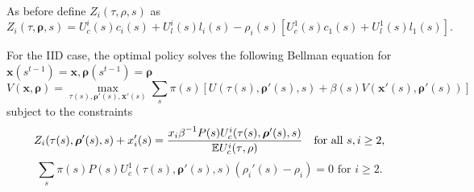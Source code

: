 \documentclass[11.5pt,twoside]{article}
\begin{document}
As before define $Z_i(\tau,\rho,s)$ as
\[Z_i(\tau,\bm \rho,s)=U^i_c(s)c_i(s)+U^i_l(s)l_i(s)-\rho_i(s)\left[U^1_c(s)c_1(s)+U^1_l(s)l_1(s)\right].\]

%
%
%
%
%
For the IID case,  the optimal policy  solves the following Bellman equation for $\bm{x}(s^{t-1})=\bm{x},\bm{\rho}(s^{t-1})=\bm{\rho}$
%
 \begin{equation}
 \label{eq:ss-obj}
 	V(\bm x,\bm \rho) = \max_{\tau(s),\bm \rho'(s),\bm x'(s)}\sum_s \pi(s)\left[ U(\tau(s),\bm \rho'(s),s) + \beta(s) V(\bm x'(s),\bm \rho'(s))\right]
 \end{equation}
subject to the constraints
 \begin{equation}
 \label{eq:ss-imp}
 	Z_i(\tau(s),\bm \rho'(s),s) + x'_i(s) = \frac{x_i \beta^{-1}P(s) U^i_c(\tau(s),\bm \rho'(s),s)}{\mathbb{E} U^i_c(\tau,\rho)}\text{   for all  $s,i \geq 2$,}\\
 \end{equation}
\begin{equation}
\label{eq:bondcondtion}
 	\sum_s \pi(s)P(s)U^1_c(\tau(s),\bm \rho'(s),s)(\rho_i'(s)-\rho_i) = 0 \text{  for $i \geq 2.$}
\end{equation}
\end{document}
